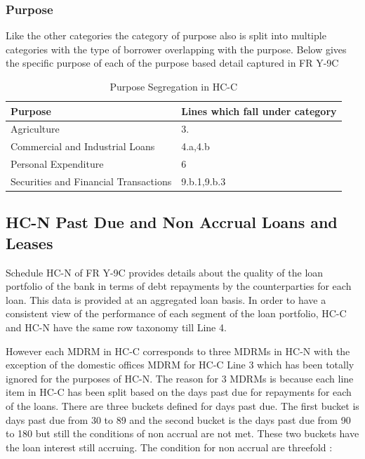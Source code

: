\documentclass[conference]{IEEEtran}
\begin{document}
        \subsubsection{Purpose}
             Like the other categories the category of purpose also is split into multiple categories with the type of borrower overlapping with the purpose. Below gives the specific purpose of each of the purpose based detail captured in FR Y-9C
             \begin{table}[htbp]
             	\centering
             	\caption{Purpose Segregation in HC-C}
             	\begin{tabular}{|p{3.5cm}|p{4cm}|}
             		\hline
             		\textbf{Purpose} & \textbf{Lines which fall under category} \\
             		\hline
             		Agriculture & 3. \\
             		\hline
             		Commercial and Industrial Loans & 4.a,4.b \\
             		\hline
             		Personal Expenditure & 6 \\
             		\hline
             		Securities and Financial Transactions & 9.b.1,9.b.3\\
             		\hline
             	\end{tabular}
             \end{table}
            		
\subsection{HC-N Past Due and Non Accrual Loans and Leases}
	Schedule HC-N of FR Y-9C provides details about the quality of the loan portfolio of the bank in terms of debt repayments by the counterparties for each loan. This data is provided at an aggregated loan basis. In order to have a consistent view of the performance of each segment of the loan portfolio, HC-C and HC-N have the same row taxonomy till Line 4. 
	
	However each MDRM in HC-C corresponds to three MDRMs in HC-N with the exception of the domestic offices MDRM for HC-C Line 3 which has been totally ignored for the purposes of HC-N. The reason for 3 MDRMs is because each line item in HC-C has been split based on the days past due for repayments for each of the loans. There are three buckets defined for days past due. The first bucket is days past due from 30 to 89 and the second bucket is the days past due from 90 to 180 but still the conditions of non accrual are not met. These two buckets have the loan interest still accruing. The condition for non accrual are threefold :
	
\end{document}
